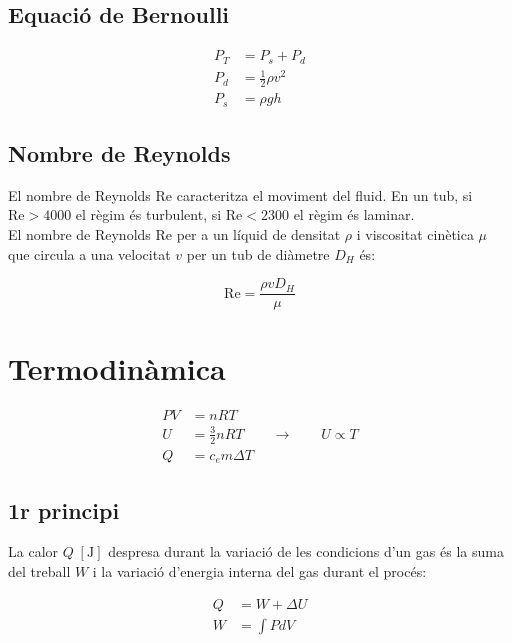 \subsection{Equació de Bernoulli}
\label{sub:equaci_de_bernoulli}

\begin{align}
    P_T &= P_s + P_d\\
    P_d &= \frac{1}{2}\rho v^2\\
    P_s &= \rho g h
\end{align}

\subsection{Nombre de Reynolds}
\label{sub:nombre_de_reynolds}

El nombre de Reynolds  Re caracteritza el moviment del fluid. En un tub, si
$\mathrm{Re} > 4000$ el règim és turbulent, si $\mathrm{Re} < 2300$ el règim és laminar.\\

El nombre de Reynolds Re per a un líquid de densitat $\rho$ i viscositat cinètica $\mu$ que circula a una velocitat $v$ per un tub de diàmetre $D_H$ és:

\begin{equation}
    \mathrm{Re} = \frac{\rho v D_H}{\mu} 
\end{equation}

\section{Termodinàmica}
\label{sec:termodinamica}

\begin{align}
    PV &= nRT \\
    U &= \frac{3}{2}nRT \qquad \rightarrow \qquad U \propto T \\
    Q &= c_em\Delta T
\end{align}

\subsection{1r principi}
\label{sub:1r_principi}

La calor $Q\;[\si{\joule}]$ despresa durant la variació de les condicions d'un
gas és la suma del treball $W$ i la variació d'energia interna del gas durant
el procés:

\begin{align}
    Q &= W + \Delta U \\
    W &= \int P dV
\end{align}

